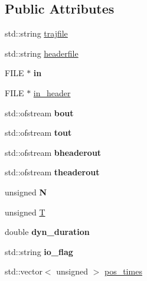 \subsection*{Public Attributes}
\begin{DoxyCompactItemize}
\item 
std\+::string \hyperlink{class_trajectory_aee056cca538c4430eacff9534e43bc8e}{trajfile}
\item 
std\+::string \hyperlink{class_trajectory_a6bb5d5e4ad4fb36a65d6cffdc6ab05af}{headerfile}
\item 
\mbox{\label{class_trajectory_aa6725e54b483f0eaaae88710707e58fe}} 
F\+I\+LE $\ast$ {\bfseries in}
\item 
F\+I\+LE $\ast$ \hyperlink{class_trajectory_a6a7484c5282331583841b038997d597b}{in\+\_\+header}
\item 
\mbox{\label{class_trajectory_a41053c7c21f625933b4dd290da958b7c}} 
std\+::ofstream {\bfseries bout}
\item 
\mbox{\label{class_trajectory_a2373f0055623b904e6051c0681d13472}} 
std\+::ofstream {\bfseries tout}
\item 
\mbox{\label{class_trajectory_abf8e0a2b50a2e873c261720e295687ac}} 
std\+::ofstream {\bfseries bheaderout}
\item 
\mbox{\label{class_trajectory_a90e41427f7c6ce7b5b549e072fd9f59d}} 
std\+::ofstream {\bfseries theaderout}
\item 
\mbox{\label{class_trajectory_a849e3a9c92a6eea27073c4e533412a67}} 
unsigned {\bfseries N}
\item 
unsigned \hyperlink{class_trajectory_ad9cbff5cf9f84ca1e2378d1d6105c5e3}{T}
\item 
\mbox{\label{class_trajectory_ada15a7d6836e4cee2f35f788df0d844f}} 
double {\bfseries dyn\+\_\+duration}
\item 
\mbox{\label{class_trajectory_abc9b9bb15f5723a208f0ff22cd740eda}} 
std\+::string {\bfseries io\+\_\+flag}
\item 
std\+::vector$<$ unsigned $>$ \hyperlink{class_trajectory_a4b6369fb83108e27a774f50c06169817}{pos\+\_\+times}

\end{DoxyCompactItemize}
